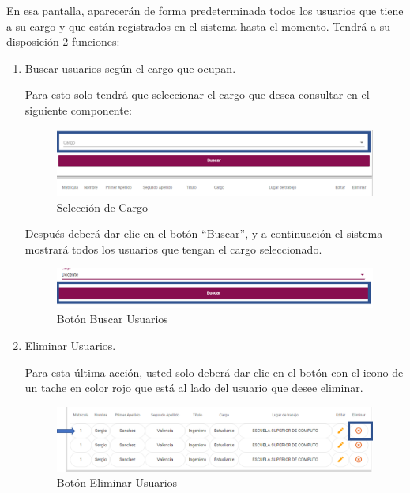         En esa pantalla, aparecerán de forma predeterminada todos los usuarios que tiene a su cargo y que están registrados en el sistema hasta el momento. Tendrá a su disposición 2 funciones:
        
        \begin{enumerate}
        
            \item   Buscar usuarios según el cargo que ocupan.
        
                Para esto solo tendrá que seleccionar el cargo que desea consultar en el siguiente componente:
            
                \begin{figure}[!hbtp]
                    \centering
                    \hypertarget{cargo1}{\includegraphics[width=0.7\linewidth]{images/SP5/BtnCargo1}}
                    \caption{Selección de Cargo}
                    \label{cargo1}
                \end{figure}
            
                Después deberá dar clic en el botón “Buscar”, y a continuación el sistema mostrará todos los usuarios que tengan el cargo seleccionado.
                
                \begin{figure}[!hbtp]
                    \centering
                    \hypertarget{buscar}{\includegraphics[width=0.7\linewidth]{images/SP5/BtnBuscar2}}
                    \caption{Botón Buscar Usuarios}
                    \label{buscar}
                \end{figure}
                
            \item Eliminar Usuarios.
            
                Para esta última acción, usted solo deberá dar clic en el botón con el icono de un tache en color rojo que está al lado del usuario que desee  eliminar. 
            
                \begin{figure}[!hbtp]
                    \centering
                    \hypertarget{eliminar}{\includegraphics[width=0.7\linewidth]{images/SP5/BtnEliminar}}
                    \caption{Botón Eliminar Usuarios}
                    \label{eliminar}
                \end{figure}
            

\end{enumerate}

